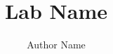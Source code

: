 \documentclass{LabReport}
\author{Author Name}
\title{Lab Name}
\begin{document}
\EltigreTitle
\tableofcontents
\newpage






\end{document}
